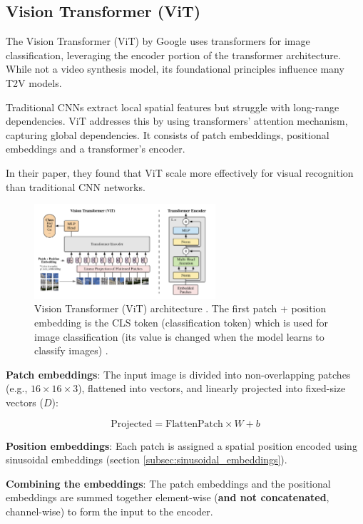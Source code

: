 \subsection{Vision Transformer (ViT)}
\label{appendix:vision_transformer}

The Vision Transformer (ViT) \cite{vision_transformer} by Google uses transformers for image classification, leveraging the encoder portion of the transformer architecture. While not a video synthesis model, its foundational principles influence many T2V models.

Traditional CNNs extract local spatial features but struggle with long-range dependencies. ViT addresses this by using transformers' attention mechanism, capturing global dependencies. It consists of patch embeddings, positional embeddings and a transformer's encoder.

In their paper, they found that ViT scale more effectively for visual recognition than traditional CNN networks.

\begin{figure}
    \centering
    \includegraphics[width=0.6\textwidth]{images/appendix/vision_transformer/architecture.png}
    \caption{Vision Transformer (ViT) architecture \cite{vision_transformer}. The first patch + position embedding is the CLS token (classification token) which is used for image classification (its value is changed when the model learns to classify images) \cite{vision_transformer}.}
\end{figure}

\textbf{Patch embeddings}: The input image is divided into non-overlapping patches (e.g., $16\times 16\times 3$), flattened into vectors, and linearly projected into fixed-size vectors ($D$):

\[ \text{Projected} = \text{FlattenPatch} \times W + b \]

\textbf{Position embeddings}: Each patch is assigned a spatial position encoded using sinusoidal embeddings (section \ref{subsec:sinusoidal_embeddings}).

\textbf{Combining the embeddings}: The patch embeddings and the positional embeddings are summed together element-wise (\textbf{and not concatenated}, channel-wise) to form the input to the encoder.

